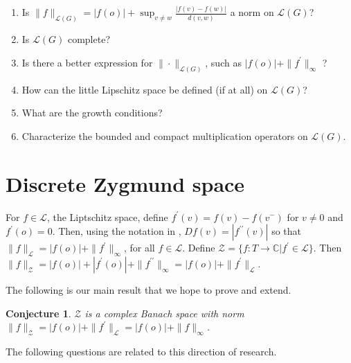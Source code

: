 \documentclass[11 pt]{report}
\newtheorem{conjecture}[theorem]{Conjecture}
\theoremstyle{definition}
\theoremstyle{definition}
\begin{document}
\begin{enumerate}
\item Is $\| f \|_{\mathcal{L}(G)} = |f(o)|+\sup_{v \neq w} \frac{|f(v)-f(w)|}{d(v,w)}$ a norm on $\mathcal{L}(G)$?
\item Is $\mathcal{L}(G)$ complete?
\item Is there a better expression for $\| \cdot \|_{\mathcal{L}(G)}$, such as $|f(o)| + \|f^\prime \|_\infty$ ?
\item How can the little Lipschitz space be defined (if at all) on $\mathcal{L}(G)$?
\item What are the growth conditions?
\item Characterize the bounded and compact multiplication operators on $\mathcal{L}(G)$.
\end{enumerate}

\section{Discrete Zygmund space}

\indent \indent For $f \in \mathcal{L}$, the Liptschitz space, define $f^\prime (v) = f(v) - f(v^-)$ for $v \neq 0$ and $f^\prime (o)=0$. Then, using the notation in \cite{Tree}, $Df(v)=|f^{\prime\prime} (v)|$ so that $\|f\|_\mathcal{L} = |f(o)| + \|f^\prime\|_\infty$, for all $f \in \mathcal{L}$. Define $\mathcal{Z}=\{f:T \to \mathbb{C}|f^\prime \in \mathcal{L}\}$. Then $\|f\|_\mathcal{Z} = |f(o)| + |f^\prime(o)| + \|f^{\prime\prime}\|_\infty = |f(o)| + \|f^\prime\|_\mathcal{L}$.

\indent The following is our main result that we hope to prove and extend. 
\begin{conjecture}\label{Zygmund} $\mathcal{Z}$ is a complex Banach space with norm $\|f\|_\mathcal{Z} = |f(o)|+\|f^\prime\|_\mathcal{L}=|f(o)|+\|f\|_\infty$.\end{conjecture} 

\indent The following questions are related to this direction of research.
\end{document}
